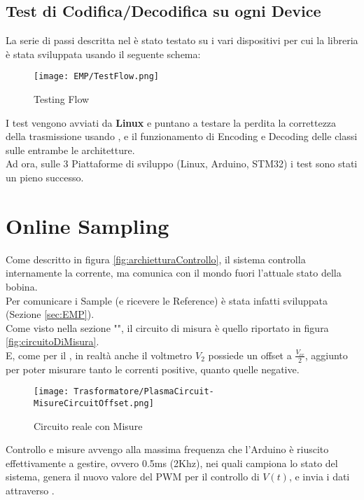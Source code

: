\subsection{Test di Codifica/Decodifica su ogni Device}
La serie di passi descritta nel  è stato testato su i vari dispositivi per cui la libreria è stata sviluppata usando il seguente schema:
\begin{figure}[h]
	\centering
	\caption[EMP Benchmark Testing Flow]{Testing Flow}
	\texttt{[image: EMP/TestFlow.png]}
\end{figure}

\noindent
I test vengono avviati da \textbf{Linux} e puntano a testare la perdita la correttezza della trasmissione usando , e il funzionamento di Encoding e Decoding delle classi sulle entrambe le architetture.\\
Ad ora, sulle 3 Piattaforme di sviluppo (Linux, Arduino, STM32) i test sono stati un pieno successo.

\newpage
\section{Online Sampling}
Come descritto in figura \ref{fig:archietturaControllo}, il sistema controlla internamente la corrente, ma comunica con il mondo fuori l'attuale stato della bobina.\\
Per comunicare i Sample (e ricevere le Reference) è stata infatti sviluppata (Sezione \ref{sec:EMP}).\\
Come visto nella sezione "", il circuito di misura è quello riportato in figura \ref{fig:circuitoDiMisura}.\\
E, come per il , in realtà anche il voltmetro $V_2$ possiede un offset a $\frac{V_{cc}}{2}$, aggiunto per poter misurare tanto le correnti positive, quanto quelle negative.
\begin{figure}[h]
	\centering
	\caption[Circuito equivalente del Plasma con l'offset delle Misure]{Circuito reale con Misure}
	\texttt{[image: Trasformatore/PlasmaCircuit-MisureCircuitOffset.png]}
\end{figure}

\noindent
Controllo e misure avvengo alla massima frequenza che l'Arduino è riuscito effettivamente a gestire, ovvero 0.5ms (2Khz), nei quali campiona lo stato del sistema, genera il nuovo valore del PWM per il controllo di $V(t)$, e invia i dati attraverso .

